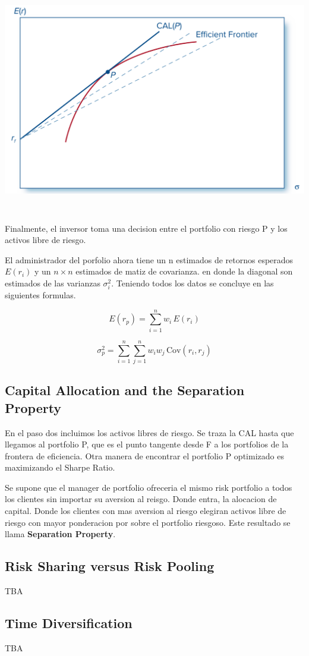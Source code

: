 \documentclass{article}
\begin{document}
\bigskip
\includegraphics[width=15cm, height=10cm]{./img/7_minima_varianza_sharpe.png}

Finalmente, el inversor toma una decision entre el portfolio con riesgo P y los activos libre de riesgo.
\bigskip

El administrador del porfolio ahora tiene un n estimados de retornos esperados $E(r_i)$ y un $n\times  n$ estimados de matiz de covarianza.
en donde la diagonal son estimados de las varianzas $\sigma^2_i$. Teniendo todos los datos se concluye en las siguientes formulas.

\begin{equation}
E(r_p) = \sum_{i=1}^{n} w_i \, E(r_i)
\end{equation}

\begin{equation}
\sigma_p^2 = \sum_{i=1}^{n} \sum_{j=1}^{n} w_i w_j \, \text{Cov}(r_i, r_j)
\end{equation}

\subsection{Capital Allocation and the Separation Property}
En el paso dos incluimos los activos libres de riesgo. Se traza la CAL hasta que llegamos al portfolio P, que es el punto tangente
 desde F a los portfolios de la frontera de eficiencia.  Otra manera de encontrar el portfolio P optimizado es maximizando el Sharpe Ratio.

Se supone que el manager de portfolio ofreceria el mismo risk portfolio a todos los clientes sin importar su aversion al reisgo. Donde entra,
la alocacion de capital. Donde los clientes con mas aversion al riesgo elegiran activos libre de riesgo con mayor ponderacion por sobre el portfolio riesgoso.
Este resultado se llama \textbf{Separation Property}.

\subsection{Risk Sharing versus Risk Pooling}
TBA
\subsection{Time Diversification}
TBA
\end{document}

